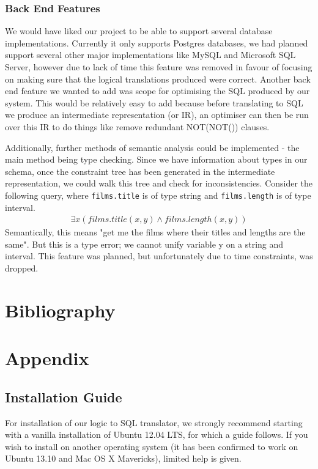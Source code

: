 \documentclass[a4paper, 11pt]{article}
\begin{document}
    \subsubsection{Back End Features} 
    We would have liked our project to be able to support several database
    implementations. Currently it only supports Postgres databases, we had
    planned support several other major implementations like MySQL and
    Microsoft SQL Server, however due to lack of time this feature was removed
    in favour of focusing on making sure that the logical translations produced
    were correct. Another back end feature we wanted to add was scope for
    optimising the SQL produced by our system. This would be relatively easy to
    add because before translating to SQL we produce an intermediate
    representation (or IR), an optimiser can then be run over this IR to do
    things like remove redundant NOT(NOT()) clauses.
   
    Additionally, further methods of semantic analysis could be implemented -
    the main method being type checking. Since we have information about types
    in our schema, once the constraint tree has been generated in the
    intermediate representation, we could walk this tree and check for
    inconsistencies. Consider the following query, where \texttt{films.title}
    is of type string and \texttt{films.length} is of type interval.
    \begin{gather}
        \exists x(films.title(x, y) \land films.length(x, y))
    \end{gather}
    Semantically, this means "get me the films where their titles and lengths
    are the same". But this is a type error; we cannot unify variable y on a
    string and interval. This feature was planned, but unfortunately due to
    time constraints, was dropped.



\section{Bibliography}
  \printbibliography

\appendix
\section{Appendix}
  \subsection{Installation Guide}
    For installation of our logic to SQL translator, we strongly recommend
    starting with a vanilla installation of Ubuntu 12.04 LTS, for which a guide
    follows. If you wish to install on another operating system (it has been 
    confirmed to work on Ubuntu 13.10 and Mac OS X Mavericks),
    limited help is given.
\end{document}
